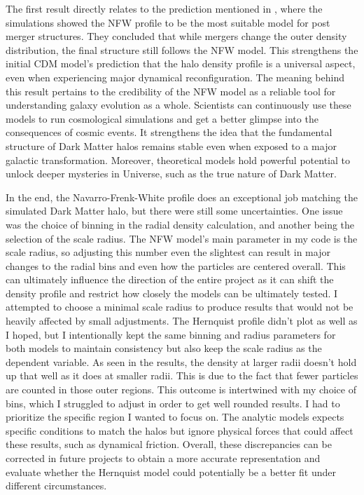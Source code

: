 \documentclass[fleqn,usenatbib]{mnras}
\begin{document}
The first result directly relates to the prediction mentioned in \citep{2019MNRAS.487..993D}, where the simulations showed the NFW profile to be the most suitable model for post merger structures. They concluded that while mergers change the outer density distribution, the final structure still follows the NFW model. This strengthens the initial CDM model's prediction that the halo density profile is a universal aspect, even when experiencing major dynamical reconfiguration. The meaning behind this result pertains to the credibility of the NFW model as a reliable tool for understanding galaxy evolution as a whole. Scientists can continuously use these models to run cosmological simulations and get a better glimpse into the consequences of cosmic events. It strengthens the idea that the fundamental structure of Dark Matter halos remains stable even when exposed to a major galactic transformation. Moreover, theoretical models hold powerful potential to unlock deeper mysteries in Universe, such as the true nature of Dark Matter.

In the end, the Navarro-Frenk-White profile does an exceptional job matching the simulated Dark Matter halo, but there were still some uncertainties. One issue was the choice of binning in the radial density calculation, and another being the selection of the scale radius. The NFW model's main parameter in my code is the scale radius, so adjusting this number even the slightest can result in major changes to the radial bins and even how the particles are centered overall. This can ultimately influence the direction of the entire project as it can shift the density profile and restrict how closely the models can be ultimately tested. I attempted to choose a minimal scale radius to produce results that would not be heavily affected by small adjustments. The Hernquist profile didn't plot as well as I hoped, but I intentionally kept the same binning and radius parameters for both models to maintain consistency but also keep the scale radius as the dependent variable. As seen in the results, the density at larger radii doesn't hold up that well as it does at smaller radii. This is due to the fact that fewer particles are counted in those outer regions. This outcome is intertwined with my choice of bins, which I struggled to adjust in order to get well rounded results. I had to prioritize the specific region I wanted to focus on. The analytic models expects specific conditions to match the halos but ignore physical forces that could affect these results, such as dynamical friction. Overall, these discrepancies can be corrected in future projects to obtain a more accurate representation and evaluate whether the Hernquist model could potentially be a better fit under different circumstances. 
\end{document}
